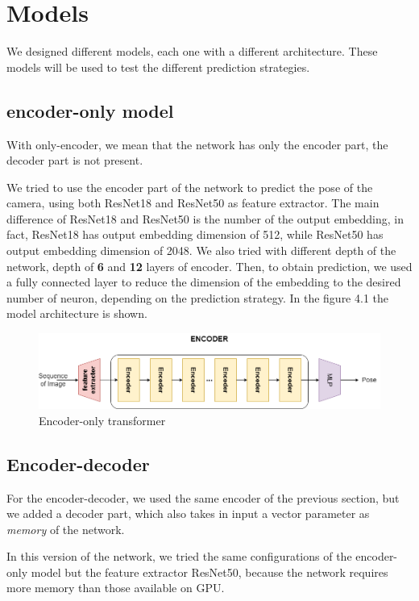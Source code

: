 \section{Models}\label{sec:encoder}
We designed different models, each one with a different architecture.
These models will be used to test the different prediction strategies.
\subsection{encoder-only model}\label{subsec:encoder-only-model}
With only-encoder, we mean that the network has only the encoder part, the decoder part is not present.

We tried to use the encoder part of the network to predict the pose of the camera, using both ResNet18 and ResNet50 as feature extractor.
The main difference of ResNet18 and ResNet50 is the number of the output embedding, in fact, ResNet18 has output embedding dimension of 512, while ResNet50 has output embedding dimension of 2048.
We also tried with different depth of the network, depth of \textbf{6} and \textbf{12} layers of encoder.
Then, to obtain prediction, we used a fully connected layer to reduce the dimension of the embedding to the desired number of neuron, depending on the prediction strategy.
In the figure 4.1 the model architecture is shown.
\begin{figure}[H]
    \centering
    \includegraphics[width=\textwidth]{images/4_encoder_only}
    \caption{Encoder-only transformer}\label{fig:figure-encoder-only-transformer}
\end{figure}

\subsection{Encoder-decoder}\label{subsec:encoder-decoder}

For the encoder-decoder, we used the same encoder of the previous section, but we added a decoder part, which also takes in input a vector parameter as \textit{memory} of the network.

In this version of the network, we tried the same configurations of the encoder-only model but the feature extractor ResNet50, because the network requires more memory than those available on GPU.

